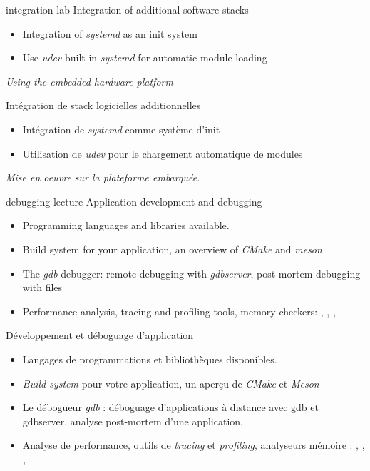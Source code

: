 {integration}
{lab}
{Integration of additional software stacks}
{
  \begin{itemize}
  \item Integration of {\em systemd} as an init system
  \item Use {\em udev} built in {\em systemd} for automatic module
    loading
  \end{itemize}

  \vspace{0.5cm}
  {\em Using the embedded hardware platform}
}
{Intégration de stack logicielles additionnelles}
{
  \begin{itemize}
  \item Intégration de {\em systemd} comme système d'init
  \item Utilisation de {\em udev} pour le chargement automatique de
    modules
  \end{itemize}

  \vspace{0.5cm}
  {\em Mise en oeuvre sur la plateforme embarquée.}
}
{debugging}
{lecture}
{Application development and debugging}
{
  \begin{itemize}
  \item Programming languages and libraries available.
  \item Build system for your application, an overview of {\em CMake}
    and {\em meson}
  \item The {\em gdb} debugger: remote debugging with {\em gdbserver},
    post-mortem debugging with  files
  \item Performance analysis, tracing and profiling tools, memory
    checkers: , , ,
  \end{itemize}
}
{Développement et déboguage d'application}
{
  \begin{itemize}
  \item Langages de programmations et bibliothèques disponibles.
  \item {\em Build system} pour votre application, un aperçu de {\em
      CMake} et {\em Meson}
  \item Le débogueur {\em gdb} : déboguage d'applications à distance
    avec gdb et gdbserver, analyse post-mortem d'une application.
  \item Analyse de performance, outils de {\em tracing} et {\em
      profiling}, analyseurs mémoire : , ,
    , 
  \end{itemize}
}
